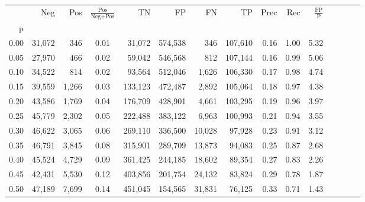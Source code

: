 \begin{tabular}{rrrcrrrrrrrrrrr}
\toprule
{} &     Neg &     Pos & $\frac{\text{Pos}}{\text{Neg}+\text{Pos}}$ &       TN &       FP &       FN &       TP &  Prec &   Rec & $\frac{\text{FP}}{\text{P}}$ \\
p    &         &         &                                            &          &          &          &          &       &       &                              \\
\midrule
0.00 &  31,072 &     346 &                                       0.01 &   31,072 &  574,538 &      346 &  107,610 &  0.16 &  1.00 &                         5.32 \\
0.05 &  27,970 &     466 &                                       0.02 &   59,042 &  546,568 &      812 &  107,144 &  0.16 &  0.99 &                         5.06 \\
0.10 &  34,522 &     814 &                                       0.02 &   93,564 &  512,046 &    1,626 &  106,330 &  0.17 &  0.98 &                         4.74 \\
0.15 &  39,559 &   1,266 &                                       0.03 &  133,123 &  472,487 &    2,892 &  105,064 &  0.18 &  0.97 &                         4.38 \\
0.20 &  43,586 &   1,769 &                                       0.04 &  176,709 &  428,901 &    4,661 &  103,295 &  0.19 &  0.96 &                         3.97 \\
0.25 &  45,779 &   2,302 &                                       0.05 &  222,488 &  383,122 &    6,963 &  100,993 &  0.21 &  0.94 &                         3.55 \\
0.30 &  46,622 &   3,065 &                                       0.06 &  269,110 &  336,500 &   10,028 &   97,928 &  0.23 &  0.91 &                         3.12 \\
0.35 &  46,791 &   3,845 &                                       0.08 &  315,901 &  289,709 &   13,873 &   94,083 &  0.25 &  0.87 &                         2.68 \\
0.40 &  45,524 &   4,729 &                                       0.09 &  361,425 &  244,185 &   18,602 &   89,354 &  0.27 &  0.83 &                         2.26 \\
0.45 &  42,431 &   5,530 &                                       0.12 &  403,856 &  201,754 &   24,132 &   83,824 &  0.29 &  0.78 &                         1.87 \\
0.50 &  47,189 &   7,699 &                                       0.14 &  451,045 &  154,565 &   31,831 &   76,125 &  0.33 &  0.71 &                         1.43 \\

\end{tabular}
